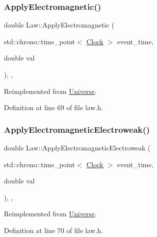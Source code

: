 \subsubsection{\texorpdfstring{Apply\+Electromagnetic()}{ApplyElectromagnetic()}}
{\footnotesize\ttfamily double Law\+::\+Apply\+Electromagnetic (\begin{DoxyParamCaption}\item[{std\+::chrono\+::time\+\_\+point$<$ \hyperlink{universe_8h_a0ef8d951d1ca5ab3cfaf7ab4c7a6fd80}{Clock} $>$}]{event\+\_\+time,  }\item[{double}]{val }\end{DoxyParamCaption})\hspace{0.3cm}{\ttfamily [inline]}, {\ttfamily [final]}, {\ttfamily [virtual]}}



Reimplemented from \hyperlink{class_universe_a1f787da78fa196ba635db21a9e91dabb}{Universe}.



Definition at line 69 of file law.\+h.

\mbox{\label{class_law_a4485046db890a95cea16573042a4f4f6}} 
\subsubsection{\texorpdfstring{Apply\+Electromagnetic\+Electroweak()}{ApplyElectromagneticElectroweak()}}
{\footnotesize\ttfamily double Law\+::\+Apply\+Electromagnetic\+Electroweak (\begin{DoxyParamCaption}\item[{std\+::chrono\+::time\+\_\+point$<$ \hyperlink{universe_8h_a0ef8d951d1ca5ab3cfaf7ab4c7a6fd80}{Clock} $>$}]{event\+\_\+time,  }\item[{double}]{val }\end{DoxyParamCaption})\hspace{0.3cm}{\ttfamily [inline]}, {\ttfamily [final]}, {\ttfamily [virtual]}}



Reimplemented from \hyperlink{class_universe_a4c36c1ab30db993307f88363dde5e8c5}{Universe}.



Definition at line 70 of file law.\+h.

\mbox{\label{class_law_a04efdc724335219ab0affdcffb55eea2}} 
